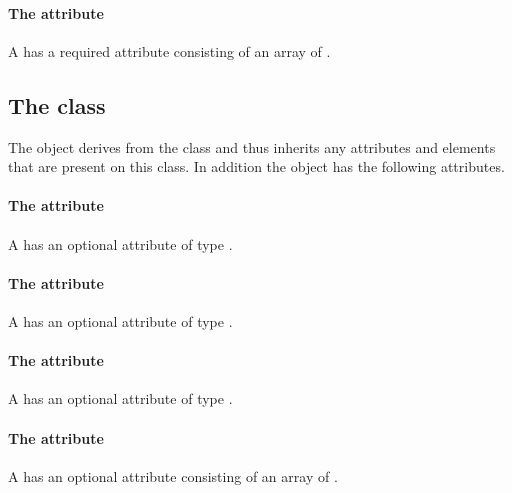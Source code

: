 \paragraph{The \fixttspace{} attribute}

A \Transformation has a required attribute  consisting
of an array of .

\subsection{The  class}
\label{graphicalprimitiveoned-class}


The \GraphicalPrimitiveOneD object derives from the
 class and thus inherits any attributes and
elements that are present on this class.
In addition the \GraphicalPrimitiveOneD object has the following
attributes.

\paragraph{The \fixttspace{} attribute}

A \GraphicalPrimitiveOneD has an optional attribute  of type
.

\paragraph{The \fixttspace{} attribute}

A \GraphicalPrimitiveOneD has an optional attribute  of
type .

\paragraph{The \fixttspace{} attribute}

A \GraphicalPrimitiveOneD has an optional attribute 
of type .

\paragraph{The \fixttspace{} attribute}

A \GraphicalPrimitiveOneD has an optional attribute
 consisting of an array of .

